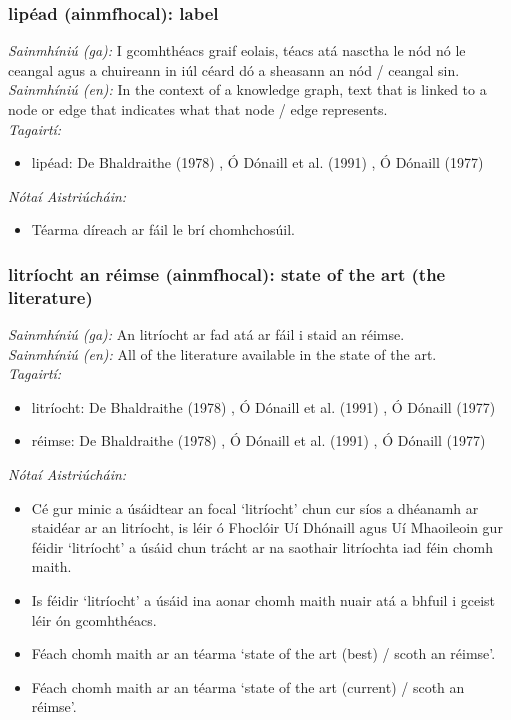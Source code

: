 \subsubsection*{lipéad (ainmfhocal): label}
 \noindent \textit{Sainmhíniú (ga):} I gcomhthéacs graif eolais, téacs atá nasctha le nód nó le ceangal agus a chuireann in iúl céard dó a sheasann an nód / ceangal sin.
\\
 \noindent \textit{Sainmhíniú (en):} In the context of a knowledge graph, text that is linked to a node or edge that indicates what that node / edge represents.
\\
 \noindent \textit{Tagairtí:}
\begin{itemize}
	\item lipéad: De Bhaldraithe (1978) \cite{de-bhaldraithe}, Ó Dónaill et al. (1991) \cite{focloir-beag}, Ó Dónaill (1977) \cite{odonaill}
\end{itemize}

 \noindent \textit{Nótaí Aistriúcháin:}
\begin{itemize}
	\item Téarma díreach ar fáil le brí chomhchosúil.
\end{itemize}


\subsubsection*{litríocht an réimse (ainmfhocal): state of the art (the literature)}
 \noindent \textit{Sainmhíniú (ga):} An litríocht ar fad atá ar fáil i staid an réimse.
\\
 \noindent \textit{Sainmhíniú (en):} All of the literature available in the state of the art.
\\
 \noindent \textit{Tagairtí:}
\begin{itemize}
	\item litríocht: De Bhaldraithe (1978) \cite{de-bhaldraithe}, Ó Dónaill et al. (1991) \cite{focloir-beag}, Ó Dónaill (1977) \cite{odonaill}
	\item réimse: De Bhaldraithe (1978) \cite{de-bhaldraithe}, Ó Dónaill et al. (1991) \cite{focloir-beag}, Ó Dónaill (1977) \cite{odonaill}
\end{itemize}

 \noindent \textit{Nótaí Aistriúcháin:}
\begin{itemize}
	\item Cé gur minic a úsáidtear an focal `litríocht' chun cur síos a dhéanamh ar staidéar ar an litríocht, is léir ó Fhoclóir Uí Dhónaill agus Uí Mhaoileoin gur féidir `litríocht' a úsáid chun trácht ar na saothair litríochta iad féin chomh maith.
	\item Is féidir `litríocht' a úsáid ina aonar chomh maith nuair atá a bhfuil i gceist léir ón gcomhthéacs.
	\item Féach chomh maith ar an téarma `state of the art (best) / scoth an réimse'.
	\item Féach chomh maith ar an téarma `state of the art (current) / scoth an réimse'.
\end{itemize}


